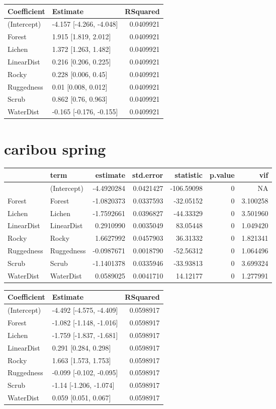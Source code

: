 \documentclass[]{article}
\begin{document}
\begin{tabular}{llr}
\toprule
Coefficient & Estimate & RSquared\\
\midrule
(Intercept) & -4.157 [-4.266, -4.048] & 0.0409921\\
Forest & 1.915 [1.819, 2.012] & 0.0409921\\
Lichen & 1.372 [1.263, 1.482] & 0.0409921\\
LinearDist & 0.216 [0.206, 0.225] & 0.0409921\\
Rocky & 0.228 [0.006, 0.45] & 0.0409921\\
Ruggedness & 0.01 [0.008, 0.012] & 0.0409921\\
Scrub & 0.862 [0.76, 0.963] & 0.0409921\\
WaterDist & -0.165 [-0.176, -0.155] & 0.0409921\\
\bottomrule
\end{tabular}

\section{caribou spring}\label{caribou-spring}

\begin{tabular}{llrrrrr}
\toprule
  & term & estimate & std.error & statistic & p.value & vif\\
\midrule
 & (Intercept) & -4.4920284 & 0.0421427 & -106.59098 & 0 & NA\\
Forest & Forest & -1.0820373 & 0.0337593 & -32.05152 & 0 & 3.100258\\
Lichen & Lichen & -1.7592661 & 0.0396827 & -44.33329 & 0 & 3.501960\\
LinearDist & LinearDist & 0.2910990 & 0.0035049 & 83.05448 & 0 & 1.049420\\
Rocky & Rocky & 1.6627992 & 0.0457903 & 36.31332 & 0 & 1.821341\\
Ruggedness & Ruggedness & -0.0987671 & 0.0018790 & -52.56312 & 0 & 1.064496\\
Scrub & Scrub & -1.1401378 & 0.0335946 & -33.93813 & 0 & 3.699324\\
WaterDist & WaterDist & 0.0589025 & 0.0041710 & 14.12177 & 0 & 1.277991\\
\bottomrule
\end{tabular}

\begin{tabular}{llr}
\toprule
Coefficient & Estimate & RSquared\\
\midrule
(Intercept) & -4.492 [-4.575, -4.409] & 0.0598917\\
Forest & -1.082 [-1.148, -1.016] & 0.0598917\\
Lichen & -1.759 [-1.837, -1.681] & 0.0598917\\
LinearDist & 0.291 [0.284, 0.298] & 0.0598917\\
Rocky & 1.663 [1.573, 1.753] & 0.0598917\\
Ruggedness & -0.099 [-0.102, -0.095] & 0.0598917\\
Scrub & -1.14 [-1.206, -1.074] & 0.0598917\\
WaterDist & 0.059 [0.051, 0.067] & 0.0598917\\
\bottomrule
\end{tabular}
\end{document}
